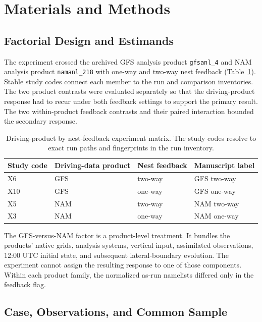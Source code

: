\documentclass[air,article,submit,moreauthors]{Definitions/mdpi}
\begin{document}
\section{Materials and Methods}

\subsection{Factorial Design and Estimands}

The experiment crossed the archived GFS analysis product \texttt{gfsanl\_4} and NAM analysis product \texttt{namanl\_218} with one-way and two-way nest feedback (Table~\ref{tab:test-matrix}).
Stable study codes connect each member to the run and comparison inventories.
The two product contrasts were evaluated separately so that the driving-product response had to recur under both feedback settings to support the primary result.
The two within-product feedback contrasts and their paired interaction bounded the secondary response.

\begin{table}[H]
\caption{Driving-product by nest-feedback experiment matrix.
The study codes resolve to exact run paths and fingerprints in the run inventory.}
\label{tab:test-matrix}
\centering
\begin{tabular}{llll}
\toprule
Study code & Driving-data product & Nest feedback & Manuscript label \\
\midrule
X6  & GFS & two-way & GFS two-way \\
X10 & GFS & one-way & GFS one-way \\
X5  & NAM & two-way & NAM two-way \\
X3  & NAM & one-way & NAM one-way \\
\bottomrule
\end{tabular}
\end{table}

The GFS-versus-NAM factor is a product-level treatment.
It bundles the products' native grids, analysis systems, vertical input, assimilated observations, 12:00 UTC initial state, and subsequent lateral-boundary evolution.
The experiment cannot assign the resulting response to one of those components.
Within each product family, the normalized as-run namelists differed only in the feedback flag.

\subsection{Case, Observations, and Common Sample}
\end{document}
